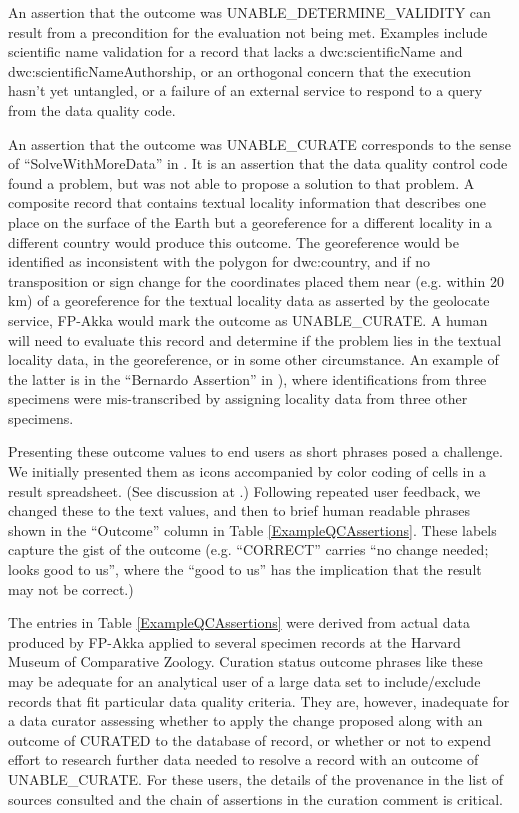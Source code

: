\documentclass{article}
\begin{document}
An assertion that the outcome was UNABLE\_DETERMINE\_VALIDITY can result from a precondition for the evaluation not being met. 
Examples include scientific name validation for a record that lacks a dwc:scientificName and dwc:scientificNameAuthorship, or an orthogonal concern that the execution hasn't yet untangled, or a failure of an external service to respond to a query from the data quality code.

An assertion that the outcome was UNABLE\_CURATE corresponds to the sense of ``SolveWithMoreData'' in \citep{morris_semantic_2013}.  It is an assertion that the data quality control code found a problem, but was not able to propose a solution to that problem.  
A composite record that contains textual locality information that describes one place on the surface of the Earth but a georeference for a different locality in a different country would produce this outcome.
The georeference would be identified as inconsistent with the polygon for dwc:country, and if no transposition or sign change for the coordinates placed them near (e.g. within 20 km) of a georeference for the textual locality data as asserted by the geolocate service, FP-Akka would mark the outcome as UNABLE\_CURATE.  
A human will need to evaluate this record and determine if the problem lies in the textual locality data, in the georeference, or in some other circumstance.
An example of the latter is in the ``Bernardo Assertion'' in \citep{morris_semantic_2013}), where identifications from three specimens were mis-transcribed by assigning locality data from three other specimens.

Presenting these outcome values to end users as short phrases posed a challenge.
We initially presented them as icons accompanied by color coding of cells in a result spreadsheet. (See discussion at \citep{FPWiki_ResultTypes}.)  Following repeated user feedback, we changed these to the text values, and then to brief human readable phrases shown in the ``Outcome'' 
column in Table \ref{ExampleQCAssertions}. %
These labels capture the gist of the outcome (e.g. ``CORRECT'' carries  ``no change needed; looks good to us'', where the ``good to us'' has the implication 
that the result may not be correct.)

The entries in Table \ref{ExampleQCAssertions} were derived from actual data produced by FP-Akka applied to several specimen records at the Harvard Museum of Comparative Zoology.
Curation status outcome phrases like these may be adequate for an analytical user of a large data set to include/exclude records that fit particular data quality criteria.  They are, however, inadequate for a data curator assessing whether to apply the change proposed along with an outcome of CURATED to the database of record, or whether or not to expend effort to research further data needed to resolve a record with an outcome of UNABLE\_CURATE.  For these users, the details of the provenance in the list of sources consulted and the chain of assertions in the curation comment is critical.  
\end{document}
